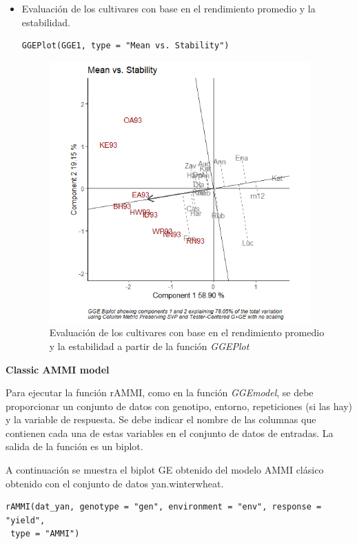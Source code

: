 \begin{itemize}
\item Evaluación de los cultivares con base en el rendimiento promedio y la estabilidad.

\begin{lstlisting}
GGEPlot(GGE1, type = "Mean vs. Stability")
\end{lstlisting}

\begin{figure}[H]
	\begin{center}
		\includegraphics[width=10cm]{./Graficos/MeanvsStability.png}
	\end{center}
	\caption{Evaluación de los cultivares con base en el rendimiento promedio y la estabilidad a partir de la función \emph{GGEPlot}}
\end{figure}

\end{itemize}


\textbf{Classic AMMI model}

Para ejecutar la función rAMMI, como en la función \emph{GGEmodel}, se debe proporcionar un conjunto de datos con genotipo, entorno, repeticiones (si las hay) y la variable de respuesta. Se debe indicar el nombre de las columnas que contienen cada una de estas variables en el conjunto de datos de entradas. La salida de la función es un biplot.

A continuación se muestra el biplot GE obtenido del modelo AMMI clásico obtenido con el conjunto de datos yan.winterwheat.

\begin{lstlisting}
rAMMI(dat_yan, genotype = "gen", environment = "env", response = "yield",
 type = "AMMI")
\end{lstlisting}

